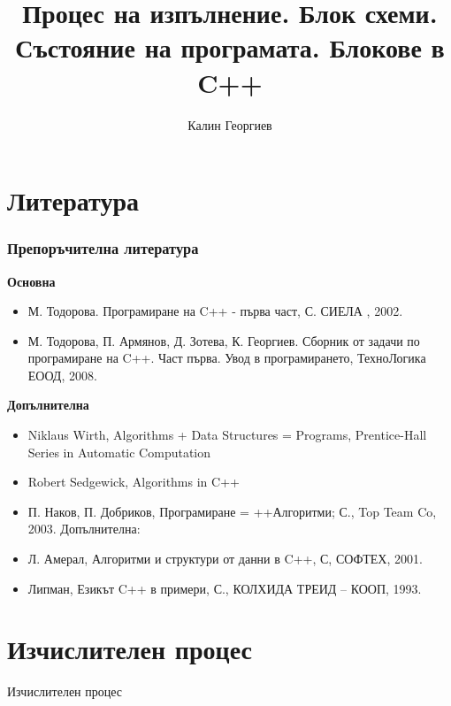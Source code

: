 \documentclass{beamer}
\begin{document}
\title[Увод в програмирането]{Процес на изпълнение. Блок схеми. Състояние на програмата. Блокове в C++} 
\author{Калин Георгиев} 
\frame{\titlepage} 


\section{Литература} 



\begin{frame}[fragile]
\frametitle{Препоръчителна литература}


\textbf{Основна}

\begin{itemize}

\item М. Тодорова. Програмиране на C++ - първа част, С. СИЕЛА , 2002.
\item М. Тодорова, П. Армянов, Д. Зотева, К. Георгиев. Сборник от задачи по програмиране на C++. Част първа. Увод в програмирането, ТехноЛогика ЕООД, 2008.

\end{itemize}


\textbf{Допълнителна}


\begin{itemize}

\item  Niklaus Wirth,  Algorithms + Data Structures = Programs, Prentice-Hall Series in Automatic Computation 
\item Robert Sedgewick, Algorithms in C++
\item П. Наков, П. Добриков, Програмиране = ++Алгоритми; С., Top Team Co, 2003.
Допълнителна:
\item Л. Амерал, Алгоритми и структури от данни в C++, С, СОФТЕХ, 2001.
\item Липман, Езикът C++ в примери, С., КОЛХИДА ТРЕИД – КООП, 1993.

\end{itemize}


\end{frame}



\section{Изчислителен процес} 


\begin{frame}
\centerline{Изчислителен процес}
\end{frame}
\end{document}
